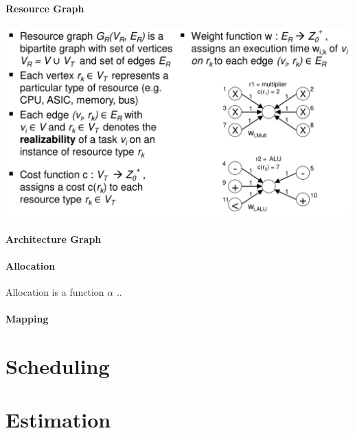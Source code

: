 \documentclass[english]{latex4ei/latex4ei_sheet}
\begin{document}
\paragraph{Resource Graph}

\begin{center}
  \includegraphics[width=\linewidth]{assets/ResourceGraph.png}
  \label{fig:resourcegraph}
\end{center}

\paragraph{Architecture Graph}

\paragraph{Allocation} Allocation is a function $\alpha$ ..

\paragraph{Mapping}



\section{Scheduling}
\section{Estimation}



\end{document}
